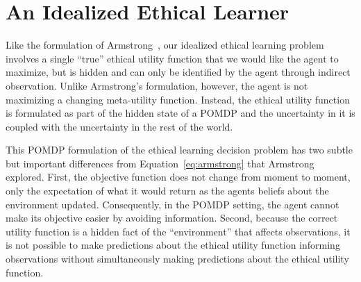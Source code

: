 \documentclass[11pt]{article}
\begin{document}

\section{An Idealized Ethical Learner}
Like the formulation of Armstrong~, our idealized ethical learning problem involves a single ``true'' ethical utility function that we would like the agent to maximize, but is hidden and can only be identified by the agent through indirect observation. Unlike Armstrong's formulation, however, the agent is not maximizing a changing meta-utility function. Instead, the ethical utility function is formulated as part of the hidden state of a POMDP and the uncertainty in it is coupled with the uncertainty in the rest of the world.

This POMDP formulation of the ethical learning decision problem has two subtle but important differences from Equation~\ref{eq:armstrong} that Armstrong explored. First, the objective function does not change from moment to moment, only the expectation of what it would return as the agents beliefs about the environment updated. Consequently, in the POMDP setting, the agent cannot make its objective easier by avoiding information. Second, because the correct utility function is a hidden fact of the ``environment'' that affects observations, it is not possible to make predictions about the ethical utility function informing observations without simultaneously making predictions about the ethical utility function.
\end{document}
